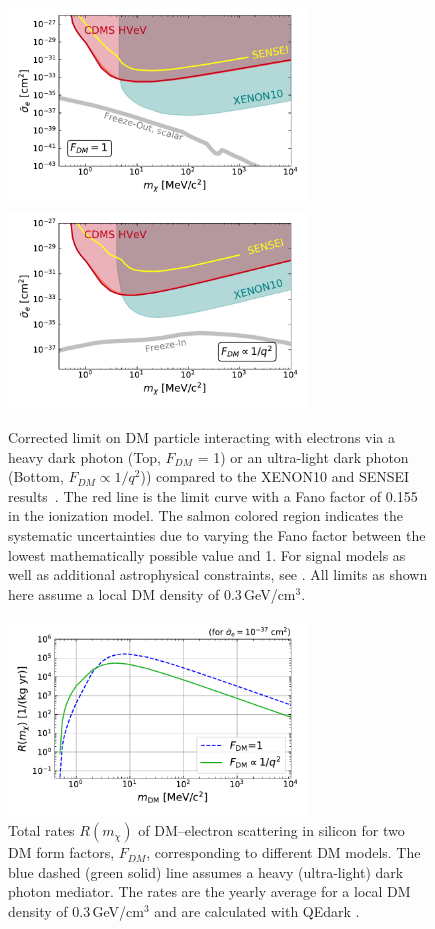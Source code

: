 \documentclass[%
reprint,
superscriptaddress,
preprintnumbers,
amsmath,amssymb,
prl,
aps,
floatfix
]{revtex4-1}
\begin{document}
\begin{figure}
\centering
\includegraphics[width=3.1in,clip=True,trim=20 20 0 10]{sigmae_FDM1_corr.pdf}
\includegraphics[width=3.1in,clip=True,trim=20 20 0 10]{sigmae_FDMq2_corr.pdf}
\caption{Corrected limit on DM particle interacting with electrons via a heavy dark photon (Top, $F_{DM}$ = 1) or an ultra-light dark photon (Bottom, $F_{DM} \propto 1/q^2$)) compared to the XENON10 and SENSEI results~\cite{Xenon10,SENSEI}. The red line is the limit curve with a Fano factor of 0.155 in the ionization model. The salmon colored region indicates the systematic uncertainties due to varying the Fano factor between the lowest mathematically possible value and 1. For signal models as well as additional astrophysical constraints, see \cite{CosmicVisions}. All limits as shown here assume a local DM density of 0.3\,GeV/cm$^3$.}
\label{fig:limitsCorr}
\end{figure}

\begin{figure}
\centering
\includegraphics[width=3.1in,clip=True,trim=20 20 0 0]{Rate.pdf}
\caption{Total rates $R(m_{\chi})$ of DM--electron scattering in silicon for two DM form factors, $F_{DM}$, corresponding to different DM models. The blue dashed (green solid) line assumes a heavy (ultra-light) dark photon mediator. The rates are the yearly average for a local DM density of 0.3\,GeV/cm$^3$ and are calculated with QEdark \cite{qedark}.}
\label{fig:rate}
\end{figure}
\end{document}
